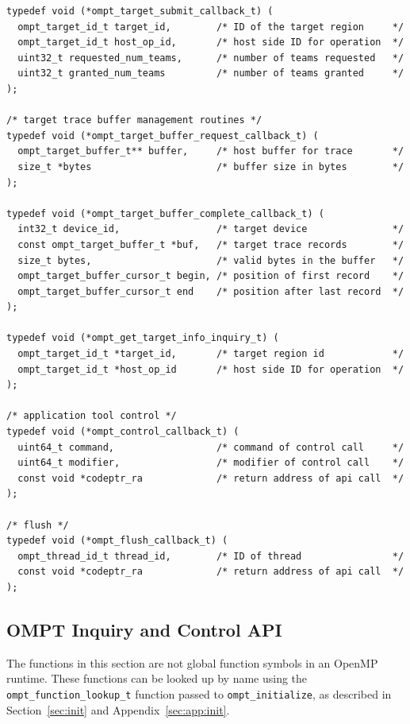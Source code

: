 \documentclass{article}
\begin{document}
\begin{verbatim}
typedef void (*ompt_target_submit_callback_t) (
  ompt_target_id_t target_id,        /* ID of the target region     */
  ompt_target_id_t host_op_id,       /* host side ID for operation  */
  uint32_t requested_num_teams,      /* number of teams requested   */
  uint32_t granted_num_teams         /* number of teams granted     */
);

/* target trace buffer management routines */
typedef void (*ompt_target_buffer_request_callback_t) (
  ompt_target_buffer_t** buffer,     /* host buffer for trace       */
  size_t *bytes                      /* buffer size in bytes        */
);
  
typedef void (*ompt_target_buffer_complete_callback_t) (
  int32_t device_id,                 /* target device               */
  const ompt_target_buffer_t *buf,   /* target trace records        */
  size_t bytes,                      /* valid bytes in the buffer   */
  ompt_target_buffer_cursor_t begin, /* position of first record    */
  ompt_target_buffer_cursor_t end    /* position after last record  */ 
);

typedef void (*ompt_get_target_info_inquiry_t) (
  ompt_target_id_t *target_id,       /* target region id            */
  ompt_target_id_t *host_op_id       /* host side ID for operation  */
);

/* application tool control */
typedef void (*ompt_control_callback_t) (
  uint64_t command,                  /* command of control call     */
  uint64_t modifier,                 /* modifier of control call    */
  const void *codeptr_ra             /* return address of api call  */
);

/* flush */
typedef void (*ompt_flush_callback_t) (
  ompt_thread_id_t thread_id,        /* ID of thread                */
  const void *codeptr_ra             /* return address of api call  */
);

\end{verbatim}


\clearpage
\subsection{OMPT Inquiry and Control API}

The functions in this section are not global function symbols in an OpenMP runtime. These functions can be looked up by name using the \verb|ompt_function_lookup_t| function passed to \verb|ompt_initialize|, as described in Section~\ref{sec:init} and Appendix~\ref{sec:app:init}.
\end{document}
